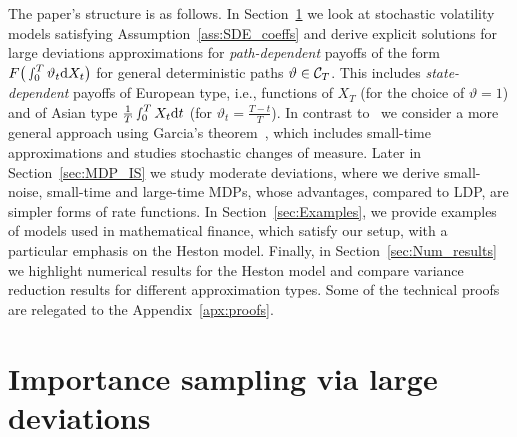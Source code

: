 
The paper's structure is as follows. In Section~\ref{sec:LDP_IS} we look at stochastic volatility models satisfying Assumption~\ref{ass:SDE_coeffs} and derive explicit solutions for large deviations approximations for \textit{path-dependent} payoffs of the form $F\big(\smallint _0^T\vartheta_t\mathrm{d} X_t\big)$ for general deterministic  paths $\vartheta\in\mathcal{C}_T$. This includes \textit{state-dependent} payoffs of European type, i.e., functions of $X_T$ (for the choice of $\vartheta = 1$) and of Asian type $\frac{1}{T}\smallint_0^TX_t\mathrm{d} t$ (for $\vartheta_t = \frac{T-t}{T}$). In contrast to~\cite{Robertson2010SampleModels} we consider a more general approach using Garcia's theorem~\cite{Garcia2007AIntegrals}, which includes small-time approximations and studies stochastic changes of measure. Later in Section~\ref{sec:MDP_IS} we study moderate deviations, where we derive small-noise, small-time and large-time MDPs, whose advantages, compared to LDP, are simpler forms of rate functions. 
In Section~\ref{sec:Examples}, 
we provide examples of models used in mathematical finance, which satisfy our setup, 
with a particular emphasis on the Heston model.
Finally, in Section~\ref{sec:Num_results} we highlight numerical results for the Heston model and compare variance reduction results for different approximation types. Some of the technical proofs are relegated to the Appendix~\ref{apx:proofs}.


\section{Importance sampling via large deviations}\label{sec:LDP_IS}

